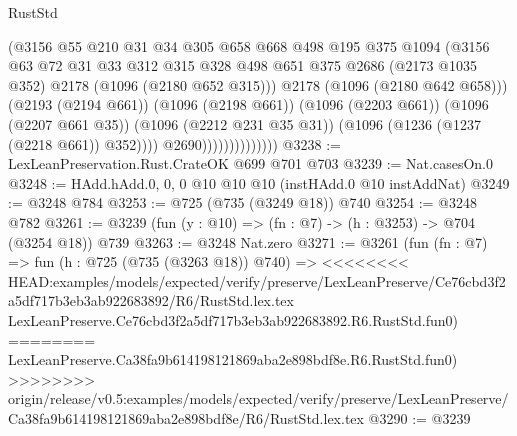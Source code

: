 \begin{lexlean}{RustStd}
\begin{coremodule}
{\begin{coremodule}
{{{{{{{{{{                                    (@3156
                                      @55
                                      @210
                                      @31
                                      @34
                                      @305
                                      @658
                                      @668
                                      @498
                                      @195
                                      @375
                                      @1094
                                      (@3156
                                        @63
                                        @72
                                        @31
                                        @33
                                        @312
                                        @315
                                        @328
                                        @498
                                        @651
                                        @375
                                        @2686
                                        (@2173 @1035 @352)
                                        @2178
                                        (@1096 (@2180 @652 @315)))
                                      @2178
                                      (@1096 (@2180 @642 @658)))
                                    (@2193 (@2194 @661))
                                    (@1096 (@2198 @661))
                                    (@1096 (@2203 @661))
                                    (@1096 (@2207 @661 @35))
                                    (@1096 (@2212 @231 @35 @31))
                                    (@1096 (@1236 (@1237 (@2218 @661)) @352))))
                                @2690))))))))))))))
@3238 := LexLeanPreservation.Rust.CrateOK @699 @701 @703
@3239 := Nat.casesOn.{0}
@3248 := HAdd.hAdd.{0, 0, 0} @10 @10 @10 (instHAdd.{0} @10 instAddNat)
@3249 := @3248 @784
@3253 := @725 (@735 (@3249 @18)) @740
@3254 := @3248 @782
@3261 := @3239 (fun (y : @10) => (fn : @7) -> (h : @3253) -> @704 (@3254 @18)) @739
@3263 := @3248 Nat.zero
@3271 := @3261
    (fun (fn : @7) =>
    fun (h : @725 (@735 (@3263 @18)) @740) =>
<<<<<<<< HEAD:examples/models/expected/verify/preserve/LexLeanPreserve/Ce76cbd3f2a5df717b3eb3ab922683892/R6/RustStd.lex.tex
    LexLeanPreserve.Ce76cbd3f2a5df717b3eb3ab922683892.R6.RustStd.fun0)
========
    LexLeanPreserve.Ca38fa9b614198121869aba2e898bdf8e.R6.RustStd.fun0)
>>>>>>>> origin/release/v0.5:examples/models/expected/verify/preserve/LexLeanPreserve/Ca38fa9b614198121869aba2e898bdf8e/R6/RustStd.lex.tex
@3290 := @3239
}}}}}}}}}}
\end{coremodule}}
\end{coremodule}
\end{lexlean}
